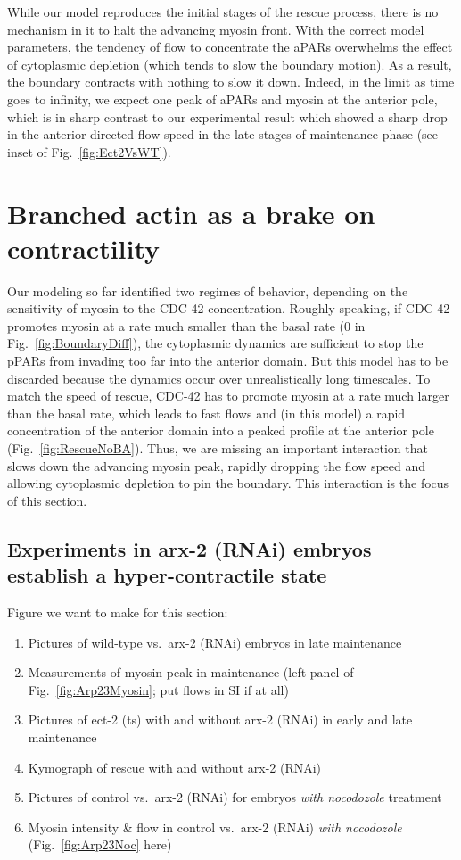 \documentclass[11pt]{article}
\newcommand{\red}[1]{\color{red}#1\normalcolor}
\newcommand{\6}[1]{#1_{\text{6}}}
\newcommand{\3}[1]{#1_{\text{3}}}
\begin{document}
While our model reproduces the initial stages of the rescue process, there is no mechanism in it to halt the advancing myosin front. With the correct model parameters, the tendency of flow to concentrate the aPARs overwhelms the effect of cytoplasmic depletion (which tends to slow the boundary motion). As a result, the boundary contracts with nothing to slow it down. Indeed, in the limit as time goes to infinity, we expect one peak of aPARs and myosin at the anterior pole, which is in sharp contrast to our experimental result which showed a sharp drop in the anterior-directed flow speed in the late stages of maintenance phase (see inset of Fig.\ \ref{fig:Ect2VsWT}).

\section{Branched actin as a brake on contractility }


Our modeling so far identified two regimes of behavior, depending on the sensitivity of myosin to the CDC-42 concentration. Roughly speaking, if CDC-42 promotes myosin at a rate much smaller than the basal rate (0 in Fig.\ \ref{fig:BoundaryDiff}), the cytoplasmic dynamics are sufficient to stop the pPARs from invading too far into the anterior domain. But this model has to be discarded because the dynamics occur over unrealistically long timescales. To match the speed of rescue, CDC-42 has to promote myosin at a rate much larger than the basal rate, which leads to fast flows and (in this model) a rapid concentration of the anterior domain into a peaked profile at the anterior pole (Fig.\ \ref{fig:RescueNoBA}). Thus, we are missing an important interaction that slows down the advancing myosin peak, rapidly dropping the flow speed and allowing cytoplasmic depletion to pin the boundary. This interaction is the focus of this section.

\subsection{Experiments in arx-2 (RNAi) embryos establish a hyper-contractile state}
\red{Figure we want to make for this section:
\begin{enumerate}[label=(\alph*),topsep=0pt,itemsep=-2ex]
\item Pictures of wild-type vs.\ arx-2 (RNAi) embryos in late maintenance
\item Measurements of myosin peak in maintenance (left panel of Fig.\ \ref{fig:Arp23Myosin}; put flows in SI if at all)
\item Pictures of ect-2 (ts) with and without arx-2 (RNAi) in early and late maintenance
\item Kymograph of rescue with and without arx-2 (RNAi) 
\item Pictures of control vs.\ arx-2 (RNAi) for embryos \emph{with nocodozole} treatment 
\item Myosin intensity \& flow in control vs.\ arx-2 (RNAi) \emph{with nocodozole} (Fig.\ \ref{fig:Arp23Noc} here)
\end{enumerate}
}
\end{document}
